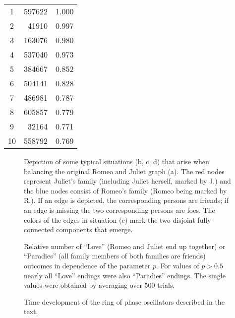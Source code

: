 \documentclass{scrartcl}
\begin{document}
\begin{table}[!htb]
\begin{subtable}{.45\linewidth}
\begin{tabular}{crc}
            \toprule
            1 & 597622  & 1.000 \\
            2 & 41910  & 0.997 \\
            3 & 163076 & 0.980 \\
            4 & 537040 & 0.973 \\
            5 & 384667 & 0.852 \\
            6 & 504141 & 0.828 \\
            7 & 486981 & 0.787 \\
            8 & 605857 & 0.779 \\
            9 & 32164  & 0.771 \\
            10 & 558792 & 0.769
        \end{tabular}
    \end{subtable} 
\end{table}

\begin{figure}
    \centering
    \def\svgwidth{0.9\textwidth}
    
    \caption{Depiction of some typical situations (b, c, d) that arise when
        balancing the original Romeo and Juliet graph (a). The red nodes
        represent Juliet's family (including Juliet herself, marked by J.) and
        the blue nodes consist of Romeo's family (Romeo being marked by
        R.). If an edge is depicted, the corresponding persons are friends;
        if an edge is missing the two corresponding persons are foes. The
        colors of the edges in situation (c) mark the two disjoint fully
        connected components that emerge.}
    \label{fig:D41}
\end{figure}

\begin{figure}
    \centering
    \caption{Relative number of \enquote{Love} (Romeo and Juliet end up
    together) or \enquote{Paradies} (all family members of both families
    are friends) outcomes in dependence of the parameter $p$. For values of $p > 0.5$ nearly all
    \enquote{Love} endings were also \enquote{Paradies} endings. The single
    values were obtained by averaging over 500 trials.}
    \label{fig:D412}
\end{figure}

\begin{figure}
    \centering
    \caption{Time development of the ring of phase oscillators described in the text.}
    \label{fig:d42}
\end{figure}
\end{document}
